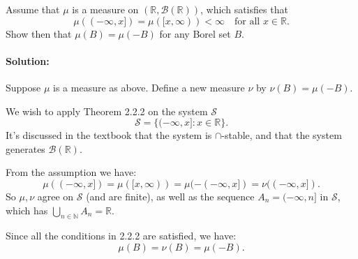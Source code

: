 \documentclass{article}
\begin{document}
\begin{exe}
    Assume that $\mu$ is a measure on $(\mathbb{R},\mathcal{B}(\mathbb{R}))$, which satisfies that 
    \[
        \mu((-\infty,x])=\mu([x,\infty))<\infty\quad \text{for all }x\in \mathbb{R}
    .\] 
    Show then that $\mu(B)=\mu(-B)$ for any Borel set $B$.
\end{exe}
\paragraph{Solution: }Suppose $\mu$ is a measure as above. Define a new measure $\nu$ by $\nu(B)=\mu(-B)$.

We wish to apply Theorem 2.2.2 on the system $\mathcal{S}$
\[
    \mathcal{S}=\{(-\infty,x]:x\in \mathbb{R}\}
.\] 
It's discussed in the textbook that the system is $\cap $-stable, and that the system generates $\mathcal{B}(\mathbb{R})$.

From the assumption we have:
\[
    \mu((-\infty,x])=\mu([x,\infty))=\mu(-(-\infty,x])=\nu((-\infty,x])
.\] 
So $\mu,\nu$ agree on $\mathcal{S}$ (and are finite), as well as the sequence $A_n=(-\infty,n]$ in $\mathcal{S}$, which has $\bigcup_{n\in \mathbb{N}} A_n=\mathbb{R}$.

Since all the conditions in 2.2.2 are satisfied, we have:
\[
    \mu(B)=\nu(B)=\mu(-B)
.\] 
\end{document}
